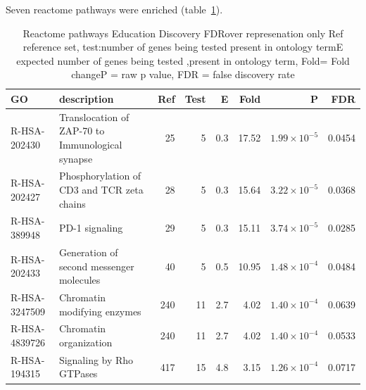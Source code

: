 Seven reactome pathways were enriched (table~\ref{tab:Reactome pathways Education Discovery FDRover represenation only}).
\begin{table}[ht]
\centering
 \setlength{\extrarowheight}{2pt}
\begin{adjustbox}{width=\textwidth}
\begin{tabular}{llrrrrrr}
  \toprule
GO & description & Ref & Test & E & Fold & P & FDR \\ 
  \midrule
R-HSA-202430 & Translocation of ZAP-70 to Immunological synapse  & 25 & 5 & 0.3 & 17.52 & $1.99 \times 10^{-5}$ & 0.0454 \\ 
  R-HSA-202427 & Phosphorylation of CD3 and TCR zeta chains  & 28 & 5 & 0.3 & 15.64 & $3.22 \times 10^{-5}$ & 0.0368 \\ 
  R-HSA-389948 & PD-1 signaling  & 29 & 5 & 0.3 & 15.11 & $3.74 \times 10^{-5}$ & 0.0285 \\ 
  R-HSA-202433 & Generation of second messenger molecules  & 40 & 5 & 0.5 & 10.95 & $1.48 \times 10^{-4}$ & 0.0484 \\ 
  R-HSA-3247509 & Chromatin modifying enzymes  & 240 & 11 & 2.7 & 4.02 & $1.40 \times 10^{-4}$ & 0.0639 \\ 
  R-HSA-4839726 & Chromatin organization  & 240 & 11 & 2.7 & 4.02 & $1.40 \times 10^{-4}$ & 0.0533 \\ 
  R-HSA-194315 & Signaling by Rho GTPases  & 417 & 15 & 4.8 & 3.15 & $1.26 \times 10^{-4}$ & 0.0717 \\ 
   \bottomrule
\end{tabular}
\end{adjustbox}
\caption{Reactome pathways Education Discovery FDRover represenation only  Ref reference set, test:number of genes being tested present in ontology termE expected number of genes being tested ,present in ontology term, Fold= Fold changeP = raw p value, FDR = false discovery rate} 
\label{tab:Reactome pathways Education Discovery FDRover represenation only}
\end{table}

           
            
